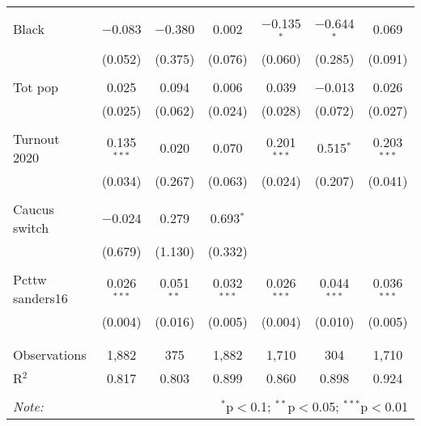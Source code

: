 \begin{table}[!htbp]
\begin{tabular}{@{\extracolsep{5pt}}lcccccc}
  & & & & & & \\ 
 Black & $-$0.083 & $-$0.380 & 0.002 & $-$0.135$^{*}$ & $-$0.644$^{*}$ & 0.069 \\ 
  & (0.052) & (0.375) & (0.076) & (0.060) & (0.285) & (0.091) \\ 
  & & & & & & \\ 
 Tot pop & 0.025 & 0.094 & 0.006 & 0.039 & $-$0.013 & 0.026 \\ 
  & (0.025) & (0.062) & (0.024) & (0.028) & (0.072) & (0.027) \\ 
  & & & & & & \\ 
 Turnout 2020 & 0.135$^{***}$ & 0.020 & 0.070 & 0.201$^{***}$ & 0.515$^{*}$ & 0.203$^{***}$ \\ 
  & (0.034) & (0.267) & (0.063) & (0.024) & (0.207) & (0.041) \\ 
  & & & & & & \\ 
 Caucus switch & $-$0.024 & 0.279 & 0.693$^{*}$ &  &  &  \\ 
  & (0.679) & (1.130) & (0.332) &  &  &  \\ 
  & & & & & & \\ 
 Pcttw sanders16 & 0.026$^{***}$ & 0.051$^{**}$ & 0.032$^{***}$ & 0.026$^{***}$ & 0.044$^{***}$ & 0.036$^{***}$ \\ 
  & (0.004) & (0.016) & (0.005) & (0.004) & (0.010) & (0.005) \\ 
  & & & & & & \\ 
\hline \\[-1.8ex] 
Observations & 1,882 & 375 & 1,882 & 1,710 & 304 & 1,710 \\ 
R$^{2}$ & 0.817 & 0.803 & 0.899 & 0.860 & 0.898 & 0.924 \\ 
\hline 
\hline \\[-1.8ex] 
\textit{Note:}  & \multicolumn{6}{r}{$^{*}$p$<$0.1; $^{**}$p$<$0.05; $^{***}$p$<$0.01} \\ 
\end{tabular} 
\end{table} 
